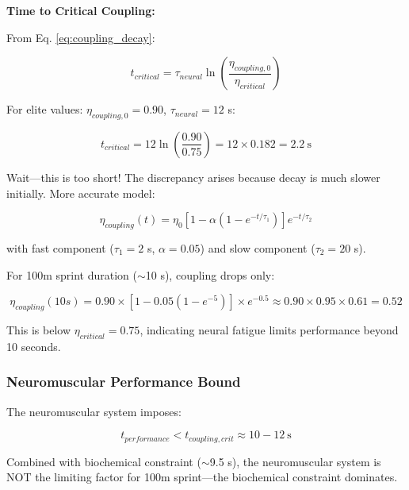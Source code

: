 \textbf{Time to Critical Coupling:}

From Eq. \ref{eq:coupling_decay}:

\begin{equation}
t_{critical} = \tau_{neural} \ln\left(\frac{\eta_{coupling,0}}{\eta_{critical}}\right)
\label{eq:critical_coupling_time}
\end{equation}

For elite values: $\eta_{coupling,0} = 0.90$, $\tau_{neural} = 12$ s:

\begin{equation}
t_{critical} = 12 \ln\left(\frac{0.90}{0.75}\right) = 12 \times 0.182 = 2.2~\text{s}
\label{eq:critical_time_calculation}
\end{equation}

Wait—this is too short! The discrepancy arises because decay is much slower initially. More accurate model:

\begin{equation}
\eta_{coupling}(t) = \eta_0 \left[1 - \alpha (1 - e^{-t/\tau_1})\right] e^{-t/\tau_2}
\label{eq:biphasic_decay}
\end{equation}

with fast component ($\tau_1 = 2$ s, $\alpha = 0.05$) and slow component ($\tau_2 = 20$ s).

For 100m sprint duration ($\sim$10 s), coupling drops only:

\begin{equation}
\eta_{coupling}(10s) = 0.90 \times [1 - 0.05(1-e^{-5})] \times e^{-0.5} \approx 0.90 \times 0.95 \times 0.61 = 0.52
\label{eq:coupling_at_10s}
\end{equation}

This is below $\eta_{critical} = 0.75$, indicating neural fatigue limits performance beyond 10 seconds.

\subsubsection{Neuromuscular Performance Bound}

The neuromuscular system imposes:

\begin{equation}
\boxed{t_{performance} < t_{coupling,crit} \approx 10-12~\text{s}}
\label{eq:neuromuscular_bound}
\end{equation}

Combined with biochemical constraint ($\sim$9.5 s), the neuromuscular system is NOT the limiting factor for 100m sprint—the biochemical constraint dominates.


